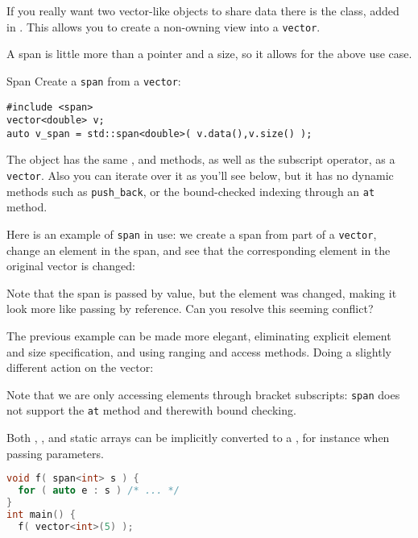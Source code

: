 If you really want two vector-like objects to share data there is the
 class, added in .
This allows you to create a non-owning view into a \lstinline{vector}.

A span is little more than a pointer and a size, so it allows for the
above use case. 

\begin{block}{Span}
  \label{sl:spandef}
Create a \lstinline{span} from a \lstinline{vector}:
\begin{lstlisting}
#include <span>
vector<double> v;
auto v_span = std::span<double>( v.data(),v.size() );
\end{lstlisting}
\end{block}

The  object has the same , and
 methods, as well as the subscript operator,
as a \lstinline{vector}.
Also you can iterate over it as you'll see below, but it has no
dynamic methods such as \lstinline{push_back},
or the bound-checked indexing through an \lstinline{at} method.

Here is an example of \lstinline{span} in use:
we create a span from part of a \lstinline{vector},
change an element in the span, and see that
the corresponding element in the original vector is changed:
%

Note that the span is passed by value, but the element was changed,
making it look more like passing by reference.
Can you resolve this seeming conflict?

The previous example can be made more elegant,
eliminating explicit element and size specification,
and using ranging and access methods.
Doing a slightly different action on the vector:
%

Note that we are only accessing elements through bracket subscripts:
\lstinline{span} does not support the \lstinline{at} method
and therewith bound checking.

\begin{remark}
  Both , , and static arrays can be
  implicitly converted to a , for instance
  when passing parameters.
\begin{lstlisting}[language=C++]
void f( span<int> s ) { 
  for ( auto e : s ) /* ... */
}
int main() {
  f( vector<int>(5) );
\end{lstlisting}
\end{remark}

